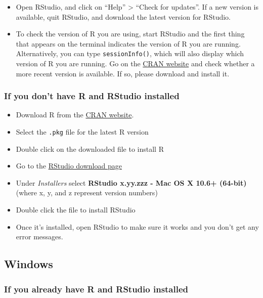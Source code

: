 \documentclass[]{book}
\providecommand{\tightlist}{%
  \setlength{\itemsep}{0pt}\setlength{\parskip}{0pt}}
\theoremstyle{definition}
\theoremstyle{definition}
\theoremstyle{remark}
\begin{document}
\begin{itemize}
\tightlist
\item
  Open RStudio, and click on ``Help'' \textgreater{} ``Check for
  updates''. If a new version is available, quit RStudio, and download
  the latest version for RStudio.
\item
  To check the version of R you are using, start RStudio and the first
  thing that appears on the terminal indicates the version of R you are
  running. Alternatively, you can type \texttt{sessionInfo()}, which
  will also display which version of R you are running. Go on the
  \href{https://cran.r-project.org/bin/macosx/}{CRAN website} and check
  whether a more recent version is available. If so, please download and
  install it.
\end{itemize}

\subsubsection*{If you don't have R and RStudio
installed}\label{if-you-dont-have-r-and-rstudio-installed}

\begin{itemize}
\tightlist
\item
  Download R from the \href{http://cran.r-project.org/bin/macosx}{CRAN
  website}.
\item
  Select the \texttt{.pkg} file for the latest R version
\item
  Double click on the downloaded file to install R
\item
  Go to the
  \href{https://www.rstudio.com/products/rstudio/download/\#download}{RStudio
  download page}
\item
  Under \emph{Installers} select \textbf{RStudio x.yy.zzz - Mac OS X
  10.6+ (64-bit)} (where x, y, and z represent version numbers)
\item
  Double click the file to install RStudio
\item
  Once it's installed, open RStudio to make sure it works and you don't
  get any error messages.
\end{itemize}

\subsection*{Windows}\label{windows}

\subsubsection*{If you already have R and RStudio
installed}\label{if-you-already-have-r-and-rstudio-installed-1}
\end{document}
